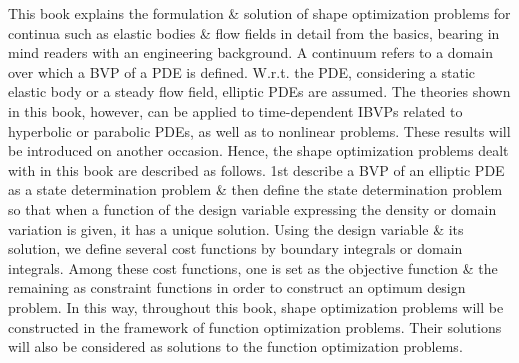 \documentclass[oneside]{book}
\numberwithin{equation}{section}
\begin{document}
This book explains the formulation \& solution of shape optimization problems for continua such as elastic bodies \& flow fields in detail from the basics, bearing in mind readers with an engineering background. A continuum refers to a domain over which a BVP of a PDE is defined. W.r.t. the PDE, considering a static elastic body or a steady flow field, elliptic PDEs are assumed. The theories shown in this book, however, can be applied to time-dependent IBVPs related to hyperbolic or parabolic PDEs, as well as to nonlinear problems. These results will be introduced on another occasion. Hence, the shape optimization problems dealt with in this book are described as follows. 1st describe a BVP of an elliptic PDE as a state determination problem \& then define the state determination problem so that when a function of the design variable expressing the density or domain variation is given, it has a unique solution. Using the design variable \& its solution, we define several cost functions by boundary integrals or domain integrals. Among these cost functions, one is set as the objective function \& the remaining as constraint functions in order to construct an optimum design problem. In this way, throughout this book, shape optimization problems will be constructed in the framework of function optimization problems. Their solutions will also be considered as solutions to the function optimization problems.
\end{document}
